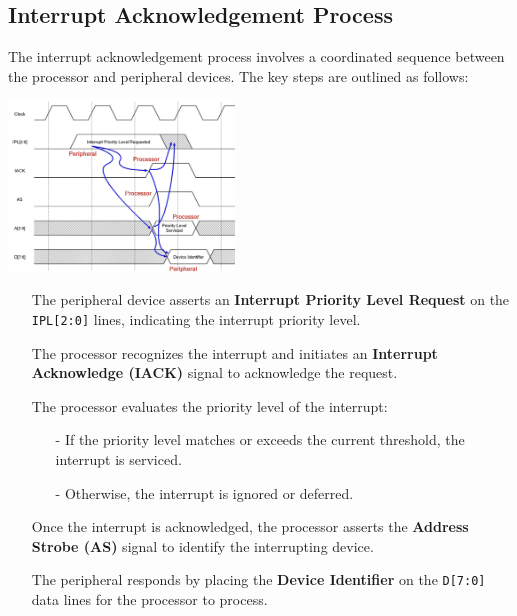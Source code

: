 \subsection{Interrupt Acknowledgement Process}

The interrupt acknowledgement process involves a coordinated sequence between the processor and peripheral devices. The key steps are outlined as follows:

\begin{center}
    \includegraphics[width=0.45\textwidth]{chapters/chapter2e/images/interrupt_ack.png}
\end{center}
\begin{itemize}
    \item[] The peripheral device asserts an \textbf{Interrupt Priority Level Request} on the \texttt{IPL[2:0]} lines, indicating the interrupt priority level.
    \item[] The processor recognizes the interrupt and initiates an \textbf{Interrupt Acknowledge (IACK)} signal to acknowledge the request.
    \item[] The processor evaluates the priority level of the interrupt:
    \begin{itemize}
        \item[-] If the priority level matches or exceeds the current threshold, the interrupt is serviced.
        \item[-] Otherwise, the interrupt is ignored or deferred.
    \end{itemize}
    \item[] Once the interrupt is acknowledged, the processor asserts the \textbf{Address Strobe (AS)} signal to identify the interrupting device.
    \item[] The peripheral responds by placing the \textbf{Device Identifier} on the \texttt{D[7:0]} data lines for the processor to process.
\end{itemize}
\newpage
